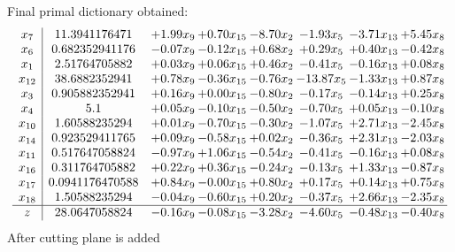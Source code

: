 \documentclass[8pt]{article}
\begin{document}
 Final primal dictionary obtained: 
\[\begin{array}{c| c c@{\hskip 2pt} c@{\hskip 2pt} c@{\hskip 2pt} c@{\hskip 2pt} c@{\hskip 2pt} c@{\hskip 2pt} }
 x_{7}   &  11.3941176471 & +  1.99 x_{9} & +  0.70 x_{15} & -8.70 x_{2} & -1.93 x_{5} & -3.71 x_{13} & +  5.45 x_{8}\\
 x_{6}   &  0.682352941176 & -0.07 x_{9} & -0.12 x_{15} & +  0.68 x_{2} & +  0.29 x_{5} & +  0.40 x_{13} & -0.42 x_{8}\\
 x_{1}   &  2.51764705882 & +  0.03 x_{9} & +  0.06 x_{15} & +  0.46 x_{2} & -0.41 x_{5} & -0.16 x_{13} & +  0.08 x_{8}\\
 x_{12}   &  38.6882352941 & +  0.78 x_{9} & -0.36 x_{15} & -0.76 x_{2} & -13.87 x_{5} & -1.33 x_{13} & +  0.87 x_{8}\\
 x_{3}   &  0.905882352941 & +  0.16 x_{9} & +  0.00 x_{15} & -0.80 x_{2} & -0.17 x_{5} & -0.14 x_{13} & +  0.25 x_{8}\\
 x_{4}   &  5.1 & +  0.05 x_{9} & -0.10 x_{15} & -0.50 x_{2} & -0.70 x_{5} & +  0.05 x_{13} & -0.10 x_{8}\\
 x_{10}   &  1.60588235294 & +  0.01 x_{9} & -0.70 x_{15} & -0.30 x_{2} & -1.07 x_{5} & +  2.71 x_{13} & -2.45 x_{8}\\
 x_{14}   &  0.923529411765 & +  0.09 x_{9} & -0.58 x_{15} & +  0.02 x_{2} & -0.36 x_{5} & +  2.31 x_{13} & -2.03 x_{8}\\
 x_{11}   &  0.517647058824 & -0.97 x_{9} & +  1.06 x_{15} & -0.54 x_{2} & -0.41 x_{5} & -0.16 x_{13} & +  0.08 x_{8}\\
 x_{16}   &  0.311764705882 & +  0.22 x_{9} & +  0.36 x_{15} & -0.24 x_{2} & -0.13 x_{5} & +  1.33 x_{13} & -0.87 x_{8}\\
 x_{17}   &  0.0941176470588 & +  0.84 x_{9} & -0.00 x_{15} & +  0.80 x_{2} & +  0.17 x_{5} & +  0.14 x_{13} & +  0.75 x_{8}\\
 x_{18}   &  1.50588235294 & -0.04 x_{9} & -0.60 x_{15} & +  0.20 x_{2} & -0.37 x_{5} & +  2.66 x_{13} & -2.35 x_{8}\\
\hline
z    &  28.0647058824 & -0.16 x_{9} & -0.08 x_{15} & -3.28 x_{2} & -4.60 x_{5} & -0.48 x_{13} & -0.40 x_{8}\\
\end{array}\]
 After cutting plane is added 
\end{document}

